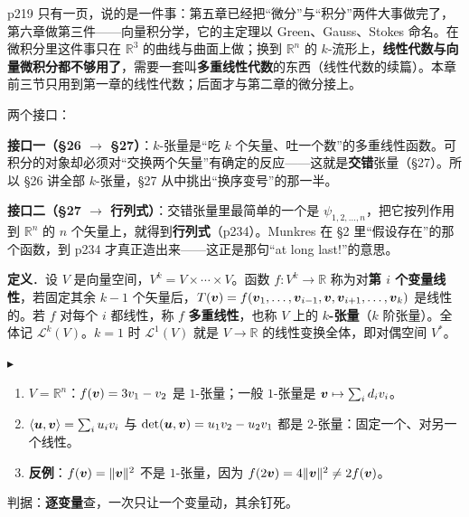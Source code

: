 \documentclass[11pt]{ctexart}
\newcommand{\step}[1]{\par\vspace{3pt}\noindent
  {\color{violet}\small$\blacktriangleright$}\hspace{3pt}{\bfseries\color{violetdeep}#1}\par\vspace{1pt}}
\newcommand{\Lk}{\mathcal{L}}
\begin{document}

p219 只有一页，说的是一件事：第五章已经把“微分”与“积分”两件大事做完了，第六章做第三件——向量积分学，它的主定理以 Green、Gauss、Stokes 命名。在微积分里这件事只在 $\mathbb R^3$ 的曲线与曲面上做；换到 $\mathbb R^n$ 的 $k$-流形上，\textbf{线性代数与向量微积分都不够用了}，需要一套叫\textbf{多重线性代数}的东西（线性代数的续篇）。本章前三节只用到第一章的线性代数；后面才与第二章的微分接上。

两个接口：

\begin{notecall}
\textbf{接口一（§26 $\to$ §27）}：$k$-张量是“吃 $k$ 个矢量、吐一个数”的多重线性函数。可积分的对象却必须对“交换两个矢量”有确定的反应——这就是\textbf{交错}张量（§27）。所以 §26 讲全部 $k$-张量，§27 从中挑出“换序变号”的那一半。

\textbf{接口二（§27 $\to$ 行列式）}：交错张量里最简单的一个是 $\psi_{1,2,\dots,n}$，把它按列作用到 $\mathbb R^n$ 的 $n$ 个矢量上，就得到\textbf{行列式}（p234）。Munkres 在 §2 里“假设存在”的那个函数，到 p234 才真正造出来——这正是那句“at long last!”的意思。
\end{notecall}



\begin{notecall}
\textbf{定义}．设 $V$ 是向量空间，$V^k=V\times\cdots\times V$。函数 $f:V^k\to\mathbb R$ 称为对\textbf{第 $i$ 个变量线性}，若固定其余 $k-1$ 个矢量后，$T(\boldsymbol{v})=f(\boldsymbol{v}_1,\dots,\boldsymbol{v}_{i-1},\boldsymbol{v},\boldsymbol{v}_{i+1},\dots,\boldsymbol{v}_k)$ 是线性的。若 $f$ 对每个 $i$ 都线性，称 $f$ \textbf{多重线性}，也称 $V$ 上的 \textbf{$k$-张量}（$k$ 阶张量）。全体记 $\Lk^k(V)$。$k=1$ 时 $\Lk^1(V)$ 就是 $V\to\mathbb R$ 的线性变换全体，即对偶空间 $V^*$。
\end{notecall}

\step{三个例子与一个反例（本讲义补）}
\begin{enumerate}
  \item $V=\mathbb R^n$：$f(\boldsymbol{v})=3v_1-v_2$ 是 $1$-张量；一般 $1$-张量是 $\boldsymbol{v}\mapsto\sum_id_iv_i$。
  \item $\langle\boldsymbol{u},\boldsymbol{v}\rangle=\sum_iu_iv_i$ 与 $\det(\boldsymbol{u},\boldsymbol{v})=u_1v_2-u_2v_1$ 都是 $2$-张量：固定一个、对另一个线性。
  \item \textbf{反例}：$f(\boldsymbol{v})=\|\boldsymbol{v}\|^2$ 不是 $1$-张量，因为 $f(2\boldsymbol{v})=4\|\boldsymbol{v}\|^2\ne2f(\boldsymbol{v})$。
\end{enumerate}
判据：\textbf{逐变量}查，一次只让一个变量动，其余钉死。
\end{document}
